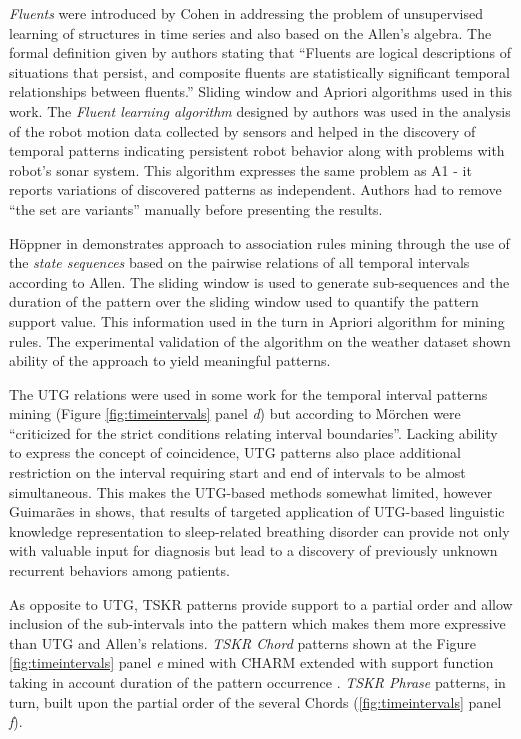 \textit{Fluents} were introduced by Cohen in \cite{citeulike:5153756} addressing the problem of unsupervised learning of structures in time series and also based on the Allen's algebra. The formal definition given by authors stating that ``Fluents are logical descriptions of situations that persist, and composite fluents are statistically significant temporal relationships between fluents.'' Sliding window and Apriori algorithms used in this work. The \textit{Fluent learning algorithm} designed by authors was used in the analysis of the robot motion data collected by sensors and helped in the discovery of temporal patterns indicating persistent robot behavior along with problems with robot's sonar system. This algorithm expresses the same problem as A1 - it reports variations of discovered patterns as independent. Authors had to remove ``the set are variants'' manually before presenting the results.

H\"{o}ppner in \cite{citeulike:5159615} demonstrates approach to association rules mining through the use of the \textit{state sequences} based on the pairwise relations of all temporal intervals according to Allen. The sliding window is used to generate sub-sequences and the duration of the pattern over the sliding window used to quantify the pattern support value. This information used in the turn in Apriori algorithm for mining rules. The experimental validation of the algorithm on the weather dataset shown ability of the approach to yield meaningful patterns.

The UTG relations were used in some work for the temporal interval patterns mining (Figure \ref{fig:timeintervals} panel \textit{d}) but according to M\"orchen \cite{citeulike:1748833} were ``criticized for the strict conditions relating interval boundaries''. Lacking ability to express the concept of coincidence, UTG patterns also place additional restriction on the interval requiring start and end of intervals to be almost simultaneous. This makes the UTG-based methods somewhat limited, however Guimar\~{a}es in \cite{citeulike:5159924} shows, that results of targeted application of UTG-based linguistic knowledge representation to sleep-related breathing disorder can provide not only with valuable input for diagnosis but lead to a discovery of previously unknown recurrent behaviors among patients.

As opposite to UTG, TSKR patterns provide support to a partial order and allow inclusion of the sub-intervals into the pattern which makes them more expressive than UTG and Allen's relations. \textit{TSKR Chord} patterns shown at the Figure \ref{fig:timeintervals} panel \textit{e} mined with CHARM \cite{citeulike:769773} extended with support function taking in account duration of the pattern occurrence \cite{citeulike:1748833}. \textit{TSKR Phrase} patterns, in turn, built upon the partial order of the several Chords (\ref{fig:timeintervals} panel \textit{f}).
